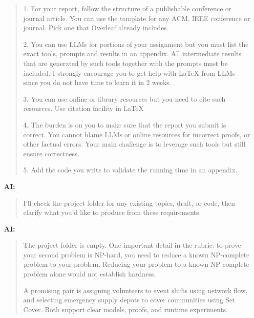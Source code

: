 \begin{quote}
1. For your report, follow the structure of a publishable conference or journal article. You can use the template for any ACM, IEEE conference or journal. Pick one that Overleaf already includes.\par
2. You can use LLMs for portions of your assignment but you must list the exact tools, prompts and results in an appendix. All intermediate results that are generated by such tools together with the prompts must be included. I strongly encourage you to get help with LaTeX from LLMs since you do not have time to learn it in 2 weeks.\par
3. You can use online or library resources but you need to cite such resources. Use citation facility in LaTeX\par
4. The burden is on you to make sure that the report you submit is correct. You cannot blame LLMs or online resources for incorrect proofs, or other factual errors. Your main challenge is to leverage such tools but still ensure correctness.\par
5. Add the code you write to validate the running time in an appendix.\par

\end{quote}

\par\medskip\noindent\textbf{AI:}\par

\begin{quote}\small\raggedright

I'll check the project folder for any existing topics, draft, or code, then clarify what you'd like to produce from these requirements.\par

\end{quote}

\par\medskip\noindent\textbf{AI:}\par

\begin{quote}\small\raggedright

The project folder is empty. One important detail in the rubric: to prove your second problem is NP-hard, you need to reduce a known NP-complete problem to your problem. Reducing your problem to a known NP-complete problem alone would not establish hardness.\par
A promising pair is assigning volunteers to event shifts using network flow, and selecting emergency supply depots to cover communities using Set Cover. Both support clear models, proofs, and runtime experiments.\par

\end{quote}

